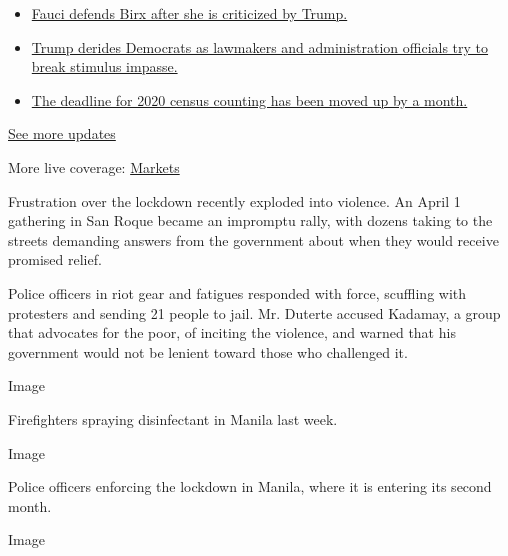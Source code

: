\begin{itemize}
\tightlist
\item
  \href{https://www.nytimes3xbfgragh.onion/2020/08/03/world/coronavirus-covid-19.html?action=click\&pgtype=Article\&state=default\&region=MAIN_CONTENT_1\&context=storylines_live_updates\#link-4547638f}{Fauci
  defends Birx after she is criticized by Trump.}
\item
  \href{https://www.nytimes3xbfgragh.onion/2020/08/03/world/coronavirus-covid-19.html?action=click\&pgtype=Article\&state=default\&region=MAIN_CONTENT_1\&context=storylines_live_updates\#link-15e7f995}{Trump
  derides Democrats as lawmakers and administration officials try to
  break stimulus impasse.}
\item
  \href{https://www.nytimes3xbfgragh.onion/2020/08/03/world/coronavirus-covid-19.html?action=click\&pgtype=Article\&state=default\&region=MAIN_CONTENT_1\&context=storylines_live_updates\#link-e5a2cda}{The
  deadline for 2020 census counting has been moved up by a month.}
\end{itemize}

\href{https://www.nytimes3xbfgragh.onion/2020/08/03/world/coronavirus-covid-19.html?action=click\&pgtype=Article\&state=default\&region=MAIN_CONTENT_1\&context=storylines_live_updates}{See
more updates}

More live coverage:
\href{https://www.nytimes3xbfgragh.onion/live/2020/08/03/business/stock-market-today-coronavirus?action=click\&pgtype=Article\&state=default\&region=MAIN_CONTENT_1\&context=storylines_live_updates}{Markets}

Frustration over the lockdown recently exploded into violence. An April
1 gathering in San Roque became an impromptu rally, with dozens taking
to the streets demanding answers from the government about when they
would receive promised relief.

Police officers in riot gear and fatigues responded with force,
scuffling with protesters and sending 21 people to jail. Mr. Duterte
accused Kadamay, a group that advocates for the poor, of inciting the
violence, and warned that his government would not be lenient toward
those who challenged it.

Image

Firefighters spraying disinfectant in Manila last week.

Image

Police officers enforcing the lockdown in Manila, where it is entering
its second month.

Image

